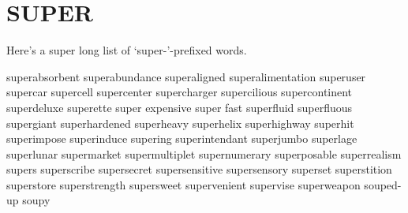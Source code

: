 \section{SUPER}
Here's a super long list of `super-'-prefixed words.

superabsorbent
superabundance
superaligned
superalimentation
superuser
supercar
supercell
supercenter
supercharger
supercilious
supercontinent
superdeluxe
superette
super expensive
super fast
superfluid
superfluous
supergiant
superhardened
superheavy
superhelix
superhighway
superhit
superimpose
superinduce
supering
superintendant
superjumbo
superlage
superlunar
supermarket
supermultiplet
supernumerary
superposable
superrealism
supers
superscribe
supersecret
supersensitive
supersensory
superset
superstition
superstore
superstrength
supersweet
supervenient
supervise
superweapon
souped-up
soupy
